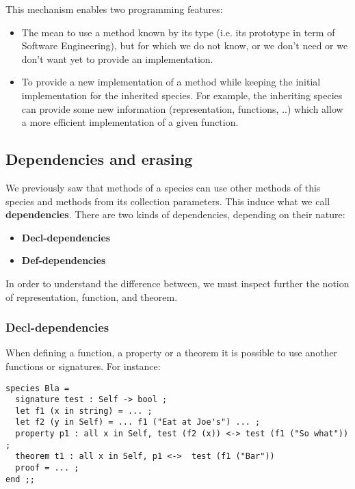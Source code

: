 \smallskip
This mechanism enables two programming features:
\begin{itemize}
  \item The mean to use a method known by its type (i.e. its prototype
    in term of Software Engineering), but for which we do not know, or
    we don't need or we don't want yet to provide an implementation.

  \item To provide a new implementation of a method while  keeping the
    initial implementation for the inherited species. For example, the
    inheriting species can provide some new information
    (representation, functions, ..) which allow a more efficient
    implementation of a given function.
\end{itemize}



\subsection{Dependencies and erasing}\label{dependencies}
We previously saw that methods of a species can use other methods of
this species and methods from its collection parameters. This induce
what we call {\bf dependencies}. There are two kinds
of dependencies, depending on their nature:
\begin{itemize}
  \item {\bf Decl-dependencies}
  \item {\bf Def-dependencies}
\end{itemize}
In order to understand the difference between, we must inspect further
the notion of representation, function, and theorem.



\subsubsection{Decl-dependencies}
When defining a function, a property or a theorem it is possible to
use another functions or signatures. For instance:
{\scriptsize
\begin{lstlisting}
species Bla =
  signature test : Self -> bool ;
  let f1 (x in string) = ... ;
  let f2 (y in Self) = ... f1 ("Eat at Joe's") ... ;
  property p1 : all x in Self, test (f2 (x)) <-> test (f1 ("So what")) ;
  theorem t1 : all x in Self, p1 <->  test (f1 ("Bar"))
  proof = ... ;
end ;;
\end{lstlisting}
}

